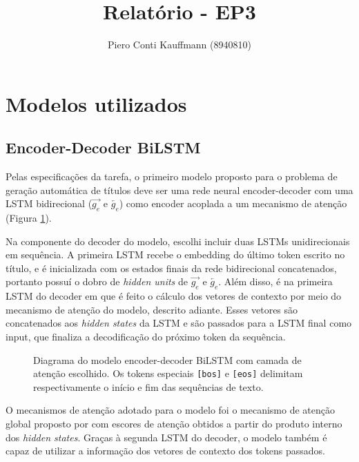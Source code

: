 \documentclass{article}
\title{Relatório - EP3}
\author{Piero Conti Kauffmann (8940810)}
\date{}
\begin{document}
\maketitle

\section{Modelos utilizados}

\subsection{Encoder-Decoder BiLSTM}

Pelas especificações da tarefa, o primeiro modelo proposto para o problema de geração automática de títulos  deve ser uma rede neural encoder-decoder com uma LSTM bidirecional ($\overrightarrow{g_{e}}$ e $\overleftarrow{g_{e}}$) como encoder acoplada a um mecanismo de atenção (Figura \ref{lstm_fig}). 

Na componente do decoder do modelo, escolhi incluir duas LSTMs unidirecionais em sequência. A primeira LSTM recebe o embedding do último token escrito no título, e é inicializada com os estados finais da rede bidirecional concatenados, portanto possuí o dobro de \textit{hidden units} de $\overrightarrow{g_{e}}$ e $\overleftarrow{g_{e}}$. Além disso, é na primeira LSTM do decoder em que é feito o cálculo dos vetores de contexto por meio do mecanismo de atenção do modelo, descrito adiante. Esses vetores são concatenados aos \textit{hidden states} da LSTM e são passados para a LSTM final como input, que finaliza a decodificação do próximo token da sequência.

\vspace{2em}

\begin{figure}[h]

\label{lstm_fig}
\caption{Diagrama do modelo encoder-decoder BiLSTM com camada de atenção escolhido. Os tokens especiais \texttt{[bos]} e \texttt{[eos]} delimitam respectivamente o início e fim das sequências de texto.}
\centering
\end{figure}

O mecanismos de atenção adotado para o modelo foi o mecanismo de atenção global proposto por \textcite{luong2015effective} com escores de atenção obtidos a partir do produto interno dos \textit{hidden states}. Graças à segunda LSTM do decoder, o modelo também é capaz de utilizar a informação dos vetores de contexto dos tokens passados.
\end{document}
